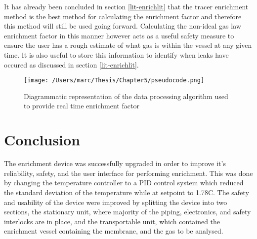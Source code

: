 It has already been concluded in section \ref{lit-enrichlit} that the tracer enrichment method is the best method for calculating the enrichment factor and therefore this method will still be used going forward. Calculating the non-ideal gas law enrichment factor in this manner however acts as a useful safety measure to ensure the user has a rough estimate of what gas is within the vessel at any given time. It is also useful to store this information to identify when leaks have occured as discussed in section \ref{lit-enrichlit}.

\begin{figure}
    \centering
    \texttt{[image: /Users/marc/Thesis/Chapter5/pseudocode.png]}
    \caption{Diagrammatic representation of the data processing algorithm used to provide real time enrichment factor}
    \label{pseudocode}
\end{figure}

\section{Conclusion}
The enrichment device was successfully upgraded in order to improve it's reliability, safety, and the user interface for performing enrichment. This was done by changing the temperature controller to a PID control system which reduced the standard deviation of the temperature while at setpoint to 1.78\textdegree C. The safety and usability of the device were improved by splitting the device into two sections, the stationary unit, where majority of the piping, electronics, and safety interlocks are in place, and the transportable unit, which contained the enrichment vessel containing the membrane, and the gas to be analysed. 

